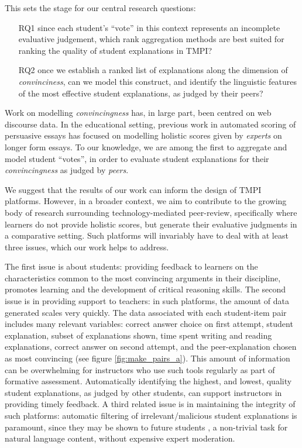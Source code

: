 \documentclass[notitlepage,12pt]{jedm}
\begin{document}
This sets the stage for our central research questions: 
\begin{itemize}
	\item[RQ1] since each student's ``vote'' in this context represents an 
	incomplete evaluative judgement, which rank aggregation 
	methods are best suited for ranking the quality of student 
	explanations in TMPI?
	\item[RQ2] once we establish a ranked list of explanations along the 
	dimension of \textit{convinciness}, can we model this construct, and 
	identify the linguistic features of the most effective student 
	explanations, as judged by their peers?
\end{itemize}

Work on modelling \textit{convincingness} has, in large part, been centred on 
web discourse data.
In the educational setting, previous work in automated scoring of persuasive 
essays has focused on modelling holistic scores given by \textit{experts} on 
longer form essays.
To our knowledge, we are among the first to aggregate and model student 
``votes'', in order to evaluate student explanations for their 
\textit{convincingness} as judged by \textit{peers}.

We suggest that the results of our work can inform the design of TMPI platforms.
However, in a broader context, we aim to contribute to the growing body of 
research surrounding technology-mediated peer-review, specifically where 
learners do not provide holistic scores, but generate their evaluative 
judgments in a comparative setting. 
Such platforms will invariably have to deal with at least three issues, which 
our work helps to address.

The first issue is about students: providing feedback to learners on the 
characteristics common to the most convincing arguments in their discipline, 
promotes learning and the development of critical reasoning skills.
The second issue is in providing support to teachers: in such platforms, the 
amount of data generated scales very quickly.
The data associated with each student-item pair includes many relevant 
variables: correct answer choice on first attempt, student explanation, subset 
of explanations shown, time spent writing and reading explanations, correct 
answer on second attempt, and the peer-explanation chosen as most convincing 
(see figure \ref{fig:make_pairs_a}).   
This amount of information can be overwhelming for instructors who use such 
tools regularly as part of formative assessment. 
Automatically identifying the highest, and lowest, quality student 
explanations, as judged by other students, can support instructors in providing 
timely feedback. 
A third related issue is in maintaining the integrity of such platforms: 
automatic filtering of irrelevant/malicious student explanations is paramount, 
since they may be shown to future students \cite{gagnon_filtering_2019}, a 
non-trivial task for natural language content, without expensive expert 
moderation.
\end{document}
